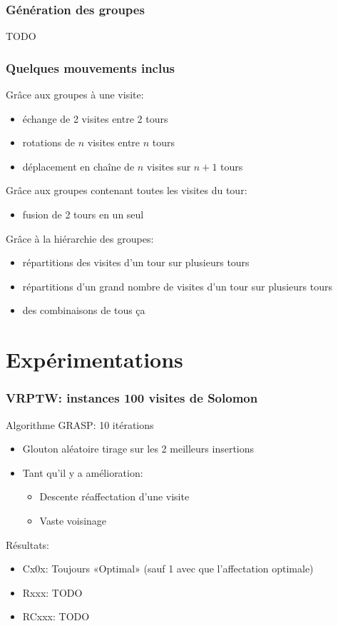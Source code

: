 \documentclass[table]{beamer}
\begin{document}
\begin{frame}
  \frametitle{Génération des groupes}

  TODO
\end{frame}

\begin{frame}
  \frametitle{Quelques mouvements inclus}

  Grâce aux groupes à une visite:
  \begin{itemize}
  \item échange de 2 visites entre 2 tours
  \item rotations de $n$ visites entre $n$ tours
  \item déplacement en chaîne de $n$ visites sur $n+1$ tours
  \end{itemize}

  Grâce aux groupes contenant toutes les visites du tour:
  \begin{itemize}
  \item fusion de 2 tours en un seul
  \end{itemize}

  Grâce à la hiérarchie des groupes:
  \begin{itemize}
  \item répartitions des visites d'un tour sur plusieurs tours
  \item répartitions d'un grand nombre de visites d'un tour sur
    plusieurs tours
  \item des combinaisons de tous ça
  \end{itemize}
\end{frame}

\section{Expérimentations}

\begin{frame}
  \frametitle{VRPTW: instances 100 visites de Solomon}

  Algorithme GRASP: 10 itérations
  \begin{itemize}
  \item Glouton aléatoire tirage sur les 2 meilleurs insertions
  \item Tant qu'il y a amélioration:
    \begin{itemize}
    \item Descente réaffectation d'une visite
    \item Vaste voisinage
    \end{itemize}
  \end{itemize}

  Résultats:
  \begin{itemize}
  \item Cx0x: Toujours «Optimal» (sauf 1 avec que l'affectation optimale)
  \item Rxxx: TODO
  \item RCxxx: TODO
  \end{itemize}
\end{frame}
\end{document}
